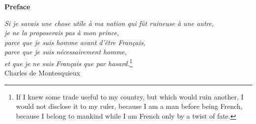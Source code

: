 \documentclass[twoside]{book}
\begin{document}
\begin{titlepage}
\hbox{\/}\vspace{12 ex} {\Huge \bf Preface}

\vspace{10 ex} \begin{flushright} {\sl Si je savais une chose
utile \`{a} ma nation qui f\^{u}t ruineuse \`{a} une autre,\\je ne
la proposerais pas \`{a} mon prince,\\parce que je suis homme
avant d'\^etre Fran\c cais,\\parce que je suis n\'ecessairement
homme,\\et que je ne suis Fran\c cais que par hasard.}\footnote{If I
knew some trade useful to my country, but which would ruin
another, I would not disclose it to my ruler, because I am a man
before being French, because I belong to mankind while I am French
only by a twist of fate.}\\ Charles de Montesquieux
\end{flushright}





\end{titlepage}
\end{document}
